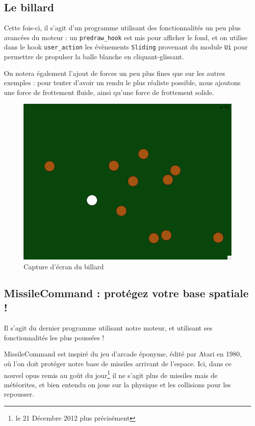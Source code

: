 \documentclass[a4paper]{scrartcl}
\begin{document}
\subsection{Le billard}

Cette fois-ci, il s'agit d'un programme utilisant des fonctionnalités
un peu plus avancées du moteur : un \texttt{predraw\_hook} est mis
pour afficher le fond, et on utilise dans le hook
\texttt{user\_action} les évènements \texttt{Sliding} provenant du
module \texttt{Ui} pour permettre de propulser la balle blanche en
cliquant-glissant.

On notera également l'ajout de forces un peu plus fines que sur les
autres exemples : pour tenter d'avoir un rendu le plus réaliste
possible, nous ajoutons une force de frottement fluide, ainsi qu'une
force de frottement solide.

\begin{figure}[h]
  \centering

  \includegraphics[scale = 0.4]{billard.pdf}
  \caption{Capture d'écran du billard}
  
\end{figure}

\subsection{MissileCommand : protégez votre base spatiale !}

Il s'agit du dernier programme utilisant notre moteur, et utilisant
ses fonctionnalités les plus poussées !

MissileCommand est inspiré du jeu d'arcade éponyme, édité par Atari en
1980, où l'on doit protéger notre base de missiles arrivant de
l'espace. Ici, dans ce nouvel opus remis au goût du jour\footnote{le
  21 Décembre 2012 plus précisément} il ne s'agit plus de missiles
mais de météorites, et bien entendu on joue sur la physique et les
collisions pour les repousser.
\end{document}
